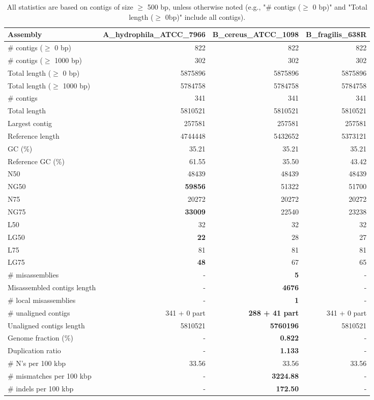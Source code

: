 \documentclass[12pt,a4paper]{article}
\begin{document}
\begin{table}[ht]
\begin{center}
\caption{All statistics are based on contigs of size $\geq$ 500 bp, unless otherwise noted (e.g., "\# contigs ($\geq$ 0 bp)" and "Total length ($\geq$ 0bp)" include all contigs).}
\begin{tabular}{|l*{3}{|r}|}
\hline
Assembly & A\_hydrophila\_ATCC\_7966 & B\_cereus\_ATCC\_1098 & B\_fragilis\_638R \\ \hline
\# contigs ($\geq$ 0 bp) & 822 & 822 & 822 \\ \hline
\# contigs ($\geq$ 1000 bp) & 302 & 302 & 302 \\ \hline
Total length ($\geq$ 0 bp) & 5875896 & 5875896 & 5875896 \\ \hline
Total length ($\geq$ 1000 bp) & 5784758 & 5784758 & 5784758 \\ \hline
\# contigs & 341 & 341 & 341 \\ \hline
Total length & 5810521 & 5810521 & 5810521 \\ \hline
Largest contig & 257581 & 257581 & 257581 \\ \hline
Reference length & 4744448 & 5432652 & 5373121 \\ \hline
GC (\%) & 35.21 & 35.21 & 35.21 \\ \hline
Reference GC (\%) & 61.55 & 35.50 & 43.42 \\ \hline
N50 & 48439 & 48439 & 48439 \\ \hline
NG50 & {\bf 59856} & 51322 & 51700 \\ \hline
N75 & 20272 & 20272 & 20272 \\ \hline
NG75 & {\bf 33009} & 22540 & 23238 \\ \hline
L50 & 32 & 32 & 32 \\ \hline
LG50 & {\bf 22} & 28 & 27 \\ \hline
L75 & 81 & 81 & 81 \\ \hline
LG75 & {\bf 48} & 67 & 65 \\ \hline
\# misassemblies & - & {\bf 5} & - \\ \hline
Misassembled contigs length & - & {\bf 4676} & - \\ \hline
\# local misassemblies & - & {\bf 1} & - \\ \hline
\# unaligned contigs & 341 + 0 part & {\bf 288 + 41 part} & 341 + 0 part \\ \hline
Unaligned contigs length & 5810521 & {\bf 5760196} & 5810521 \\ \hline
Genome fraction (\%) & - & {\bf 0.822} & - \\ \hline
Duplication ratio & - & {\bf 1.133} & - \\ \hline
\# N's per 100 kbp & 33.56 & 33.56 & 33.56 \\ \hline
\# mismatches per 100 kbp & - & {\bf 3224.88} & - \\ \hline
\# indels per 100 kbp & - & {\bf 172.50} & - \\ \hline
\end{tabular}
\end{center}
\end{table}
\end{document}
